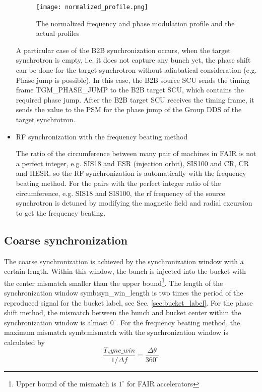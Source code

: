 \begin{itemize}
\begin{figure}[!htb]
   \centering   
   \texttt{[image: normalized\_profile.png]}
   \caption{The normalized frequency and phase modulation profile and the actual profiles}
   \label{normalized_profile}
\end{figure}  

A particular case of the B2B synchronization occurs, when the target synchrotron is empty, i.e. it does not capture any bunch yet, the phase shift can be done for the target synchrotron without adiabatical consideration (e.g. Phase jump is possible). In this case, the B2B source SCU sends the timing frame TGM\_PHASE\_JUMP to the B2B target SCU, which contains the required phase jump. After the B2B target SCU receives the timing frame, it sends the value to the PSM for the phase jump of the Group DDS of the target synchrotron. 

\item RF synchronization with the frequency beating method

The ratio of the circumference between many pair of machines in FAIR is not a perfect integer, e.g. SIS18 and ESR (injection orbit), SIS100 and CR, CR and HESR. so the RF synchronization is automatically with the frequency beating method. For the pairs with the perfect integer ratio of the circumference, e.g. SIS18 and SIS100, the rf frequency of the source synchrotron is detuned by modifying the magnetic field and radial excursion to get the frequency beating.

\end{itemize}


\subsection{Coarse synchronization}

The coarse synchronization is achieved by the synchronization window with a certain length. Within this window, the bunch is injected into the bucket with the center mismatch smaller than the upper bound\footnote{Upper bound of the mismatch is $1^\circ$ for FAIR accelerators}. The length of the synchronization window \gls{symb:syn_win_length} is two times the period of the reproduced signal for the bucket label, see Sec. \ref{sec:bucket_label}. For the phase shift method, the mismatch between the bunch and bucket center within the synchronization window is almost $0^\circ$. For the frequency beating method, the maximum mismatch \gls{symb:mismatch} with the synchronization window is calculated by 
\begin{equation}
\frac{T_sync\_win}{1/\Delta f}= \frac{\Delta \theta}{360^\circ}
\end{equation}


